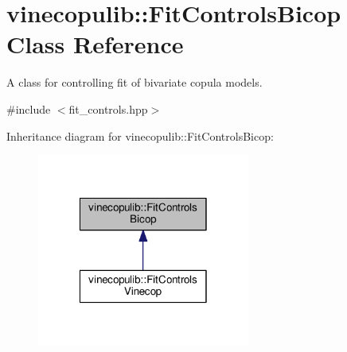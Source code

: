 \hypertarget{classvinecopulib_1_1_fit_controls_bicop}{\section{vinecopulib\+:\+:Fit\+Controls\+Bicop Class Reference}
\label{classvinecopulib_1_1_fit_controls_bicop}
}


A class for controlling fit of bivariate copula models.  




{\ttfamily \#include $<$fit\+\_\+controls.\+hpp$>$}



Inheritance diagram for vinecopulib\+:\+:Fit\+Controls\+Bicop\+:\nopagebreak
\begin{figure}[H]
\begin{center}
\leavevmode
\includegraphics[width=198pt]{classvinecopulib_1_1_fit_controls_bicop__inherit__graph}
\end{center}
\end{figure}
